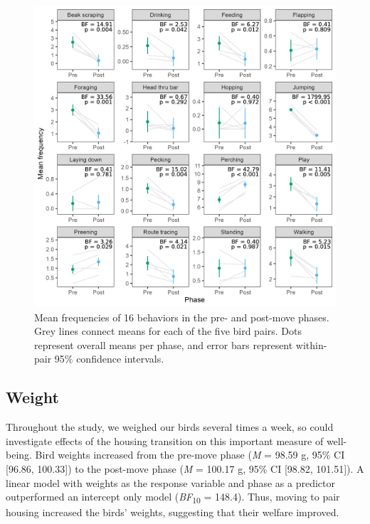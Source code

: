 \documentclass[
  pub]{apa6}
\begin{document}
\begin{figure}

{\centering \includegraphics[width=1\linewidth]{figures/behavior_freq_phase} 

}

\caption{Mean frequencies of 16 behaviors in the pre- and post-move phases. Grey lines connect means for each of the five bird pairs. Dots represent overall means per phase, and error bars represent within-pair 95\% confidence intervals.}\label{fig:behavior-fig}
\end{figure}

\hypertarget{weight}{%
\subsection{Weight}\label{weight}}

Throughout the study, we weighed our birds several times a week, so could investigate effects of the housing transition on this important measure of well-being. Bird weights increased from the pre-move phase (\emph{M} = 98.59 g, 95\% CI {[}96.86, 100.33{]}) to the post-move phase (\emph{M} = 100.17 g, 95\% CI {[}98.82, 101.51{]}). A linear model with weights as the response variable and phase as a predictor outperformed an intercept only model (\emph{BF}\textsubscript{10} = 148.4). Thus, moving to pair housing increased the birds' weights, suggesting that their welfare improved.
\end{document}
